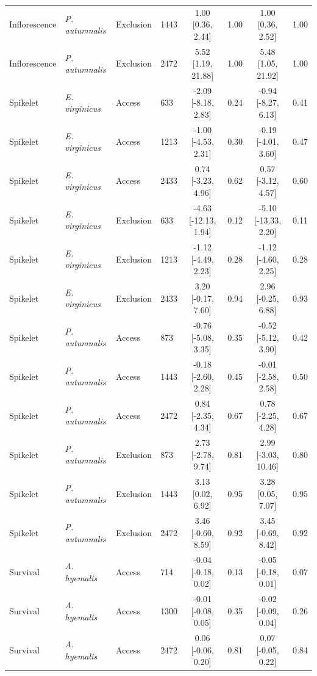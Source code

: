 \begin{landscape}
\begin{longtable}{llllcccc}
  Inflorescence & \textit{P. autumnalis} & Exclusion & 1443 & 1.00 [0.36, 2.44] & 1.00 & 1.00 [0.36, 2.52] & 1.00 \\
  Inflorescence & \textit{P. autumnalis} & Exclusion & 2472 & 5.52 [1.19, 21.88] & 1.00 & 5.48 [1.05, 21.92] & 1.00 \\
  Spikelet & \textit{E. virginicus} & Access & 633 & -2.09 [-8.18, 2.83] & 0.24 & -0.94 [-8.27, 6.13] & 0.41 \\
  Spikelet & \textit{E. virginicus} & Access & 1213 & -1.00 [-4.53, 2.31] & 0.30 & -0.19 [-4.01, 3.60] & 0.47 \\
  Spikelet & \textit{E. virginicus} & Access & 2433 & 0.74 [-3.23, 4.96] & 0.62 & 0.57 [-3.12, 4.57] & 0.60 \\
  Spikelet & \textit{E. virginicus} & Exclusion & 633 & -4.63 [-12.13, 1.94] & 0.12 & -5.10 [-13.33, 2.20] & 0.11 \\
  Spikelet & \textit{E. virginicus} & Exclusion & 1213 & -1.12 [-4.49, 2.23] & 0.28 & -1.12 [-4.60, 2.25] & 0.28 \\
  Spikelet & \textit{E. virginicus} & Exclusion & 2433 & 3.20 [-0.17, 7.60] & 0.94 & 2.96 [-0.25, 6.88] & 0.93 \\
  Spikelet & \textit{P. autumnalis} & Access & 873 & -0.76 [-5.08, 3.35] & 0.35 & -0.52 [-5.12, 3.90] & 0.42 \\
  Spikelet & \textit{P. autumnalis} & Access & 1443 & -0.18 [-2.60, 2.28] & 0.45 & -0.01 [-2.58, 2.58] & 0.50 \\
  Spikelet & \textit{P. autumnalis} & Access & 2472 & 0.84 [-2.35, 4.34] & 0.67 & 0.78 [-2.25, 4.28] & 0.67 \\
  Spikelet & \textit{P. autumnalis} & Exclusion & 873 & 2.73 [-2.78, 9.74] & 0.81 & 2.99 [-3.03, 10.46] & 0.80 \\
  Spikelet & \textit{P. autumnalis} & Exclusion & 1443 & 3.13 [0.02, 6.92] & 0.95 & 3.28 [0.05, 7.07] & 0.95 \\
  Spikelet & \textit{P. autumnalis} & Exclusion & 2472 & 3.46 [-0.60, 8.59] & 0.92 & 3.45 [-0.69, 8.42] & 0.92 \\
  Survival & \textit{A. hyemalis} & Access & 714 & -0.04 [-0.18, 0.02] & 0.13 & -0.05 [-0.18, 0.01] & 0.07 \\
  Survival & \textit{A. hyemalis} & Access & 1300 & -0.01 [-0.08, 0.05] & 0.35 & -0.02 [-0.09, 0.04] & 0.26 \\
  Survival & \textit{A. hyemalis} & Access & 2472 & 0.06 [-0.06, 0.20] & 0.81 & 0.07 [-0.05, 0.22] & 0.84 \\

\end{longtable}
\end{landscape}
